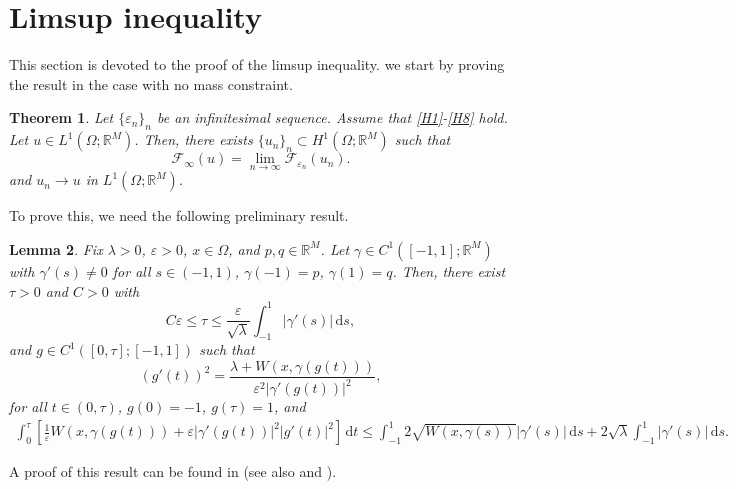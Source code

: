 \documentclass[a4paper, 11pt, reqno]{amsart}
\theoremstyle{plain}
\newtheorem{theorem}{Theorem}[section]
\newtheorem{lemma}[theorem]{Lemma}
\theoremstyle{definition}
\theoremstyle{remark}
\newcommand{\R}{\mathbb R}
\newcommand{\eps}{\varepsilon}
\newcommand{\dd}{\,\mathrm{d}}
\begin{document}



\section{Limsup inequality}\label{sec:limsup}

This section is devoted to the proof of the limsup inequality.
we start by proving the result in the case with no mass constraint.

\begin{theorem}\label{thm:limsup}
    Let $\{ \varepsilon_n \}_n$ be an infinitesimal sequence. 
    Assume that \ref{H1}-\ref{H8} hold.
    Let $u \in L^1(\Omega; \R^M)$. Then, there exists $\{u_n\}_n \subset H^1(\Omega; \R^M)$ such that 
    \[
        \mathcal{F}_\infty(u) = \lim_{n \to \infty} \mathcal{F}_{\eps_n}(u_n).
    \]
    and $u_n \to u$ in $L^1(\Omega;\R^M)$.
\end{theorem}

To prove this, we need the following preliminary result.

\begin{lemma}\label{lemma:reparameterization}
    Fix $\lambda > 0$, $\varepsilon > 0$, $x \in \Omega$, and $p,q \in \R^M$. Let $\gamma \in C^1([-1,1]; \R^M)$ with $\gamma'(s) \neq 0$ for all $s \in (-1,1)$, $\gamma(-1) = p$, $\gamma(1) = q$. Then, there exist $\tau > 0$ and $C > 0$ with
    $$ C \varepsilon \leq \tau \leq \frac{\varepsilon}{\sqrt{\lambda}} \int_{-1}^1 | \gamma'(s)| \dd s, $$
    and $g \in C^1([0, \tau]; [-1,1])$ such that
    \begin{equation}\label{eq:reparameterization_speed}
        (g'(t))^2 = \frac{\lambda + W(x,\gamma(g(t)))}{\varepsilon^2 | \gamma'(g(t))|^2},
    \end{equation}
    for all $t \in (0,\tau)$, $g(0) = -1$, $g(\tau) = 1$, and
    \begin{align*}
        \int_0^\tau \left[ \frac{1}{\varepsilon} W(x, \gamma(g(t))) + \varepsilon |\gamma'(g(t))|^2 | g'(t)|^2 \right] \dd t \leq \int_{-1}^1 2 \sqrt{W(x, \gamma(s))} | \gamma'(s) | \dd s + 2 \sqrt{\lambda} \int_{-1}^1 | \gamma'(s) |\dd s.
    \end{align*}
\end{lemma}

A proof of this result can be found in \cite[Lemma 6.3]{CriGra} (see also \cite[Proposition 2]{modica87} and \cite[Lemma 3.2]{baldo}).
\end{document}
